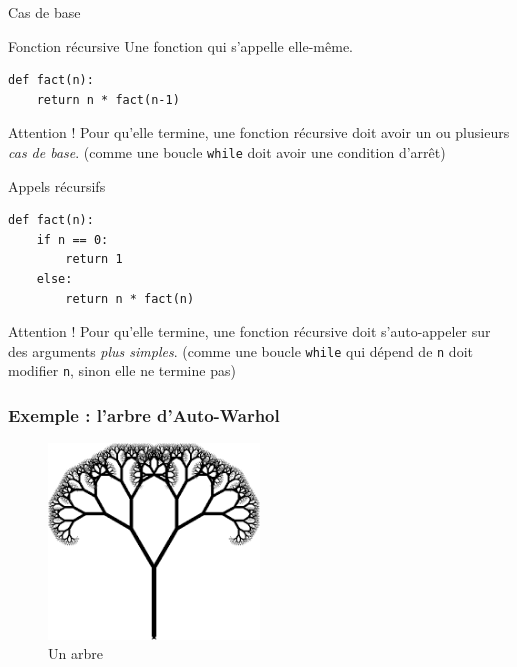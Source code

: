 \documentclass[x11names,svgnames]{beamer}
\begin{document}
\begin{frame}[fragile]{Cas de base}
  \begin{block}{Fonction récursive}
    \vspace{0pt}
    \MVRightarrow{} Une fonction qui s'appelle elle-même.
  \end{block}

\begin{verbatim}
def fact(n):
    return n * fact(n-1)
\end{verbatim}

  \pause

  \begin{alertblock}{Attention !}
    \vspace{0pt}
    Pour qu'elle termine, une fonction récursive doit avoir un ou plusieurs \emph{cas de base}. \newline
    (comme une boucle \texttt{while} doit avoir une condition d'arrêt)
  \end{alertblock}

\end{frame}

\begin{frame}[fragile]{Appels récursifs}

\begin{verbatim}
def fact(n):
    if n == 0:
        return 1
    else:
        return n * fact(n)
\end{verbatim}

  \pause

  \begin{alertblock}{Attention !}
    \vspace{0pt}
    Pour qu'elle termine, une fonction récursive doit s'auto-appeler sur des arguments \emph{plus simples}. \newline
    (comme une boucle \texttt{while} qui dépend de \texttt{n} doit modifier \texttt{n}, sinon elle ne termine pas)
  \end{alertblock}

\end{frame}

\begin{frame}
  \frametitle{Exemple : l'arbre d'Auto-Warhol}

  \begin{figure}[ht]
    \centering
    \includegraphics[width=0.5\textwidth]{fig/arbre.png}
    \caption{Un arbre}
    \label{fig:arbre}
  \end{figure}

\end{frame}
\end{document}
